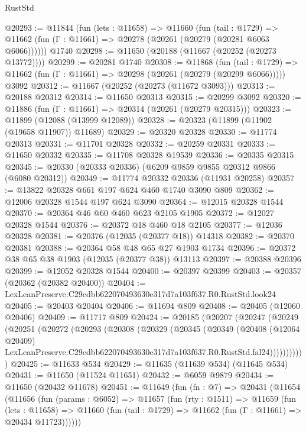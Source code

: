 \begin{lexlean}{RustStd}
\begin{coremodule}
@20293 := @11844
    (fun (lets : @11658) =>
    @11660
      (fun (tail : @1729) =>
      @11662 (fun (Γ : @11661) => @20278 (@20261 (@20279 (@20281 @6063 @6066))))))
    @1740
@20298 := @11650 (@20188 (@11667 (@20252 (@20273 @13772))))
@20299 := @20281 @1740
@20308 := @11868
    (fun (tail : @1729) => @11662 (fun (Γ : @11661) => @20298 (@20261 (@20279 (@20299 @6066)))))
    @3092
@20312 := @11667 (@20252 (@20273 (@11672 @3093)))
@20313 := @20188 @20312
@20314 := @11650 @20313
@20315 := @20299 @3092
@20320 := @11886 (fun (Γ : @11661) => @20314 (@20261 (@20279 @20315)))
@20323 := @11899 (@12088 (@13999 @12089))
@20328 := @20323 (@11899 (@11902 (@19658 @11907)) @11689)
@20329 := @20320 @20328
@20330 := @11774 @20313
@20331 := @11701 @20328
@20332 := @20259 @20331
@20333 := @11650 @20332
@20335 := @11708 @20328 @19539
@20336 := @20335 @20315
@20345 := @20330 (@20333 @20336) (@6209 @9859 @9855 @20312 @9866 (@6080 @20312))
@20349 := @11774 @20332 @20336 (@11931 @20258)
@20357 := @13822 @20328 @661 @197 @624 @460 @1740 @3090 @809
@20362 := @12006 @20328 @1544 @197 @624 @3090
@20364 := @12015 @20328 @1544
@20370 := @20364 @46 @60 @460 @623 @2105 @1905
@20372 := @12027 @20328 @1544
@20376 := @20372 @18 @460 @18 @2105
@20377 := @12036 @20328
@20381 := @20376 (@12035 (@20377 @18)) @14318
@20382 := @20370 @20381
@20388 := @20364 @58 @48 @65 @27 @1903 @1734
@20396 := @20372 @38 @65 @38 @1903 (@12035 (@20377 @38)) @13113
@20397 := @20388 @20396
@20399 := @12052 @20328 @1544
@20400 := @20397 @20399
@20403 := @20357 (@20362 (@20382 @20400))
@20404 := LexLeanPreserve.C29cdbb622070493630e317d7a103f637.R0.RustStd.look24
@20405 := @20403 @20404
@20406 := @11694 @809
@20408 := @20405 (@12060 @20406)
@20409 := @11717 @809
@20424 := @20185
    (@20207
      (@20247
        (@20249
          (@20251
            (@20272
              (@20293
                (@20308
                  (@20329
                    (@20345
                      (@20349
                        (@20408
                          (@12064 @20409)
                          LexLeanPreserve.C29cdbb622070493630e317d7a103f637.R0.RustStd.fal24)))))))))))
@20425 := @11633 @534
@20429 := @11635 (@11639 @534) (@11645 @534)
@20431 := @11650 (@11524 @11651)
@20432 := @6059 @9879
@20434 := @11650 (@20432 @11678)
@20451 := @11649
    (fun (fn : @7) =>
    @20431
      (@11654
        (@11656
          (fun (params : @6052) =>
          @11657
            (fun (rty : @1511) =>
            @11659
              (fun (lets : @11658) =>
              @11660 (fun (tail : @1729) => @11662 (fun (Γ : @11661) => @20434 @11723))))))

\end{coremodule}
\end{lexlean}
